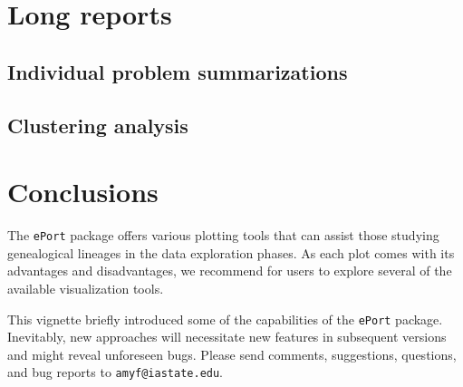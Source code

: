 \documentclass{article}\usepackage[]{graphicx}\usepackage[]{color}
\numberwithin{equation}{section} %
\newcommand{\pkg}[1]{{\texttt{#1}}}
\begin{document}
\section{Long reports}

\subsection{Individual problem summarizations}
\subsection{Clustering analysis}

\section{Conclusions}

The \pkg{ePort} package offers various plotting tools that can assist those studying genealogical lineages in the data exploration phases. As each plot comes with its advantages and disadvantages, we recommend for users to explore several of the available visualization tools.

This vignette briefly introduced some of the capabilities of the \pkg{ePort} package. Inevitably, new approaches will necessitate new features in subsequent versions and might reveal unforeseen bugs. Please send comments, suggestions, questions, and bug reports to \texttt{amyf@iastate.edu}.
\end{document}
